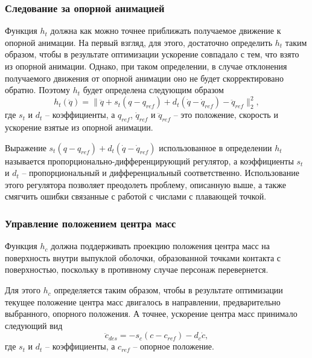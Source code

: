 \subsubsection{Следование за опорной анимацией}

Функция $h_{t}$ должна как можно точнее приближать получаемое движение к опорной анимации. На первый взгляд, для этого, достаточно определить $h_{t}$ таким образом, чтобы в результате оптимизации ускорение совпадало с тем, что взято из опорной анимации. Однако, при таком определении, в случае отклонения получаемого движения от опорной анимации оно не будет скорректировано обратно. Поэтому $h_{t}$ будет определена следующим образом
\begin{equation*}
  h_{t}(\ddot{q}) = \lVert \ddot{q} + s_{t} (q - q_{ref}) + d_{t} (\dot{q} - \dot{q}_{ref}) - \ddot{q}_{ref} \rVert_{2}^{2},
\end{equation*}
где $s_{t}$ и $d_{t}$ -- коэффициенты, а $q_{ref}$, $\dot{q}_{ref}$ и $\ddot{q}_{ref}$ -- это положение, скорость и ускорение взятые из опорной анимации.

Выражение $s_{t} (q - q_{ref}) + d_{t} (\dot{q} - \dot{q}_{ref})$ использованное в определении $h_{t}$ называется \break пропорционально-дифференцирующий регулятор, а коэффициенты $s_{t}$ и $d_{t}$ -- пропорциональный и дифференциальный соответственно. Использование этого регулятора позволяет преодолеть проблему, описанную выше, а также смягчить ошибки связанные с работой с числами с плавающей точкой.



\subsubsection{Управление положением центра масс}

Функция $h_{c}$ должна поддерживать проекцию положения центра масс на поверхность внутри выпуклой оболочки, образованной точками контакта с поверхностью, поскольку в противному случае персонаж перевернется.

Для этого $h_{c}$ определяется таким образом, чтобы в результате оптимизации текущее положение центра масс двигалось в направлении, предварительно выбранного, опорного положения. А точнее, ускорение центра масс принимало следующий вид
\begin{equation*}
  \ddot{c}_{des} = - s_{c} (c - c_{ref}) - d_{c} \dot{c}, \tag{2.6}\label{eq:2.6}
\end{equation*}
где $s_{t}$ и $d_{t}$ -- коэффициенты, а $c_{ref}$ -- опорное положение.

